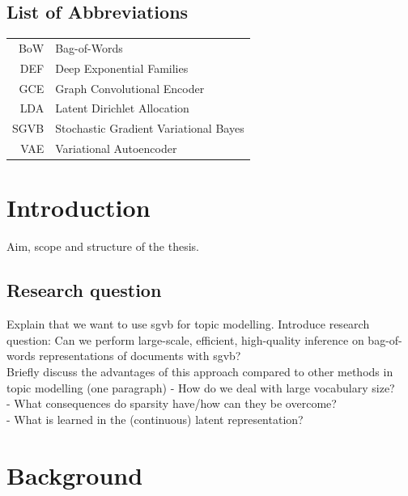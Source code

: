 \documentclass{report}
\begin{document}
\section*{List of Abbreviations}
\begin{tabular}{r l}
	\hspace{10mm} BoW & Bag-of-Words \\
	DEF & Deep Exponential Families \\
	GCE & Graph Convolutional Encoder \\
	LDA & Latent Dirichlet Allocation \\
	SGVB & Stochastic Gradient Variational Bayes \\
	VAE & Variational Autoencoder \\
\end{tabular}

\tableofcontents

\doublespacing
\chapter{Introduction}
Aim, scope and structure of the thesis. 
\section{Research question}
Explain that we want to use sgvb for topic modelling. Introduce research question:
Can we perform large-scale, efficient, high-quality inference on bag-of-words representations of documents with sgvb? \\
Briefly discuss the advantages of this approach compared to other methods in topic modelling (one paragraph)
-	How do we deal with large vocabulary size?\\
-	What consequences do sparsity have/how can they be overcome? \\
-	What is learned in the (continuous) latent representation?



\pagebreak 
\nocite{*}


\chapter{Background}
\end{document}
